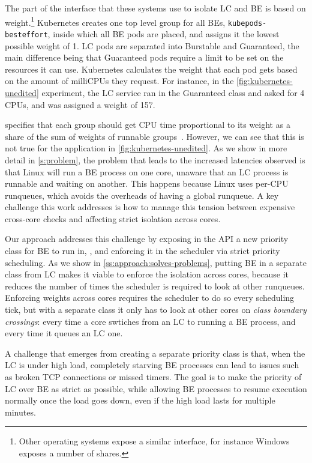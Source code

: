 The part of the \cgroups{} interface that these systems use to isolate LC and BE
is based on weight.\footnote{Other operating systems expose a similar interface,
for instance Windows exposes a number of shares.} Kubernetes creates one top
level group for all BEs, \texttt{kubepods-besteffort}, inside which all BE pods
are placed, and assigns it the lowest possible weight of 1. LC pods are
separated into Burstable and Guaranteed, the main difference being that
Guaranteed pods require a limit to be set on the resources it can use.
Kubernetes calculates the weight that each pod gets based on the amount of
milliCPUs they request. For instance, in the \autoref{fig:kubernetes-unedited}
experiment, the LC service ran in the Guaranteed class and asked for 4 CPUs, and
was assigned a weight of 157. 

\cgroups{} specifies that each group should get CPU time proportional to its
weight as a share of the sum of weights of runnable
groups~\cite{cgroups-kerneldocs}. However, we can see that this is not true for
the application in \autoref{fig:kubernetes-unedited}. As we show in more detail
in \autoref{s:problem}, the problem that leads to the increased latencies
observed is that Linux will run a BE process on one core, unaware that an LC
process is runnable and waiting on another. This happens because Linux uses
per-CPU runqueues, which avoids the overheads of having a global runqueue. A key
challenge this work addresses is how to manage this tension between expensive
cross-core checks and affecting strict isolation across cores.

Our approach addresses this challenge by exposing in the API a new priority
class for BE to run in, \beclass{}, and enforcing it in the scheduler via strict
priority scheduling. As we show in \autoref{ss:approach:solves-problems},
putting BE in a separate class from LC makes it viable to enforce the isolation
across cores, because it reduces the number of times the scheduler is required
to look at other runqueues. Enforcing weights across cores requires the
scheduler to do so every scheduling tick, but with a separate class it only has
to look at other cores on \textit{class boundary crossings}: every time a core
swtiches from an LC to running a BE process, and every time it queues an LC one.

A challenge that emerges from creating a separate priority class is that, when
the LC is under high load, completely starving BE processes can lead to issues
such as broken TCP connections or missed timers. The goal is to make the
priority of LC over BE as strict as possible, while allowing BE processes to
resume execution normally once the load goes down, even if the high load lasts
for multiple minutes.

